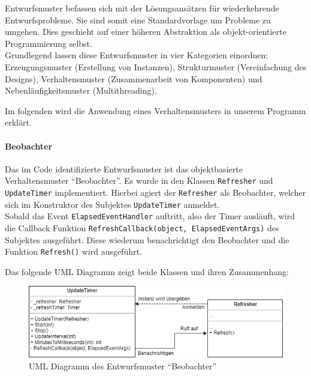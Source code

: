 
Entwurfsmuster befassen sich mit der Lösungsansätzen für wiederkehrende Entwurfsprobleme.
Sie sind somit eine Standardvorlage um Probleme zu umgehen.
Dies geschieht auf einer höheren Abstraktion als objekt-orientierte Programmierung selbst.\\
Grundlegend lassen diese Entwurfsmuster in vier Kategorien einordnen: Erzeugungsmuster (Erstellung von Instanzen), Strukturmuster (Vereinfachung des Designs), Verhaltensmuster (Zusammenarbeit von Komponenten) und Nebenläufigkeitsmuster (Multithreading).

Im folgenden wird die Anwendung eines Verhaltensmusters in unserem Programm erklärt.

\paragraph{Beobachter}
Das im Code identifizierte Entwurfsmuster ist das objektbasierte Verhaltensmuster \enquote{Beobachter}.
Es wurde in den Klassen \texttt{Refresher} und \texttt{UpdateTimer} implementiert.
Hierbei agiert der \texttt{Refresher} als Beobachter, welcher sich im Konstruktor des Subjektes \texttt{UpdateTimer} anmeldet. \\
Sobald das Event \texttt{ElapsedEventHandler} auftritt, also der Timer ausläuft, wird die Callback Funktion \texttt{RefreshCallback(object, ElapsedEventArgs)} des Subjektes ausgeführt.
Diese wiederum benachrichtigt den Beobachter und die Funktion \texttt{Refresh()} wird ausgeführt.

Das folgende UML Diagramm zeigt beide Klassen und ihren Zusammenhang:

\begin{figure}[h]
	\begin{center}
		\includegraphics[width=\linewidth]{Bilder/Beobachter_UML.png}
	\end{center}
	\caption{UML Diagramm des Entwurfsmuster \enquote{Beobachter}}
\end{figure}